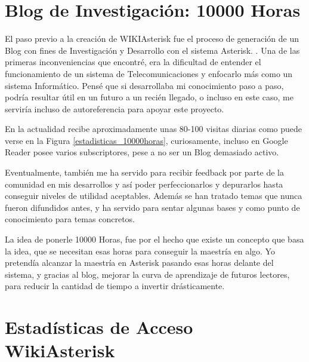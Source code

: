 
\section*{Blog de Investigación: 10000 Horas}

El paso previo a la creación de WIKIAsterisk fue el proceso de generación de un Blog con fines de Investigación y Desarrollo con el sistema Asterisk. \cite{website:10000horas}. Una de las primeras inconveniencias que encontré, era la dificultad de entender el funcionamiento de un sistema de Telecomunicaciones y enfocarlo más como un sistema Informático. Pensé que si desarrollaba mi conocimiento paso a paso, podría resultar útil en un futuro a un recién llegado, o incluso en este caso, me serviría incluso de autoreferencia para apoyar este proyecto.

En la actualidad recibe aproximadamente unas 80-100 visitas diarias como puede verse en la Figura \ref{estadisticas_10000horas}, curiosamente, incluso en Google Reader posee varios subscriptores, pese a no ser un Blog demasiado activo.

Eventualmente, también me ha servido para recibir feedback por parte de la comunidad en mis desarrollos y así poder perfeccionarlos y depurarlos hasta conseguir niveles de utilidad aceptables. Además se han tratado temas que nunca fueron difundidos antes, y ha servido para sentar algunas bases y como punto de conocimiento para temas concretos.

La idea de ponerle 10000 Horas, fue por el hecho que existe un concepto que basa la idea, que se necesitan esas horas para conseguir la maestría en algo. Yo pretendía alcanzar la maestría en Asterisk pasando esas horas delante del sistema, y gracias al blog, mejorar la curva de aprendizaje de futuros lectores, para reducir la cantidad de tiempo a invertir drásticamente.


\section*{Estadísticas de Acceso WikiAsterisk}

